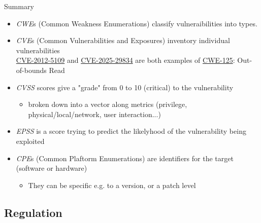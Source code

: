 \begin{frame}{Summary}
  \begin{itemize}
    \item \textit{CWE}s (Common Weakness Enumerations) classify vulneraibilities into types.
    \item \textit{CVE}s (Common Vulnerabilities and Exposures) inventory individual vulnerabilities \\
      \href{https://nvd.nist.gov/vuln/detail/CVE-2012-5109}{CVE-2012-5109} and
      \href{https://nvd.nist.gov/vuln/detail/CVE-2025-29834}{CVE-2025-29834} are both examples
      of \href{https://cwe.mitre.org/data/definitions/125.html}{CWE-125}: Out-of-bounds Read
    \item \textit{CVSS} scores give a "grade" from 0 to 10 (critical) to the vulnerability
    \begin{itemize}
	    \item broken down into a vector along metrics (privilege, physical/local/network, user interaction...)
    \end{itemize}
    \item \textit{EPSS} is a score trying to predict the likelyhood of the vulnerability being exploited
    \item \textit{CPE}s (Common Plaftorm Enumerations) are identifiers for the target (software or hardware)
    \begin{itemize}
      \item They can be specific e.g. to a version, or a patch level
    \end{itemize}
  \end{itemize}
\end{frame}

\subsection{Regulation}

